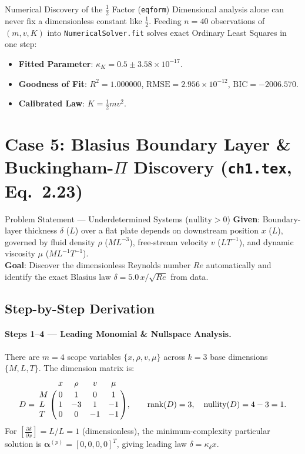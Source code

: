 \documentclass[11pt,a4paper]{article}
\newcommand{\pd}[2]{\frac{\partial #1}{\partial #2}}
\newcommand{\dimbr}[1]{\left[#1\right]}
\begin{document}
\begin{resultbox}{Numerical Discovery of the $\tfrac{1}{2}$ Factor (\texttt{eqform})}
Dimensional analysis alone can never fix a dimensionless constant like $\tfrac{1}{2}$. Feeding $n = 40$ observations of $(m, v, K)$ into \texttt{NumericalSolver.fit} solves exact Ordinary Least Squares in one step:
\begin{itemize}[leftmargin=1.4em,itemsep=2pt]
  \item \textbf{Fitted Parameter}: $\kappa_K = 0.5 \pm 3.58 \times 10^{-17}$.
  \item \textbf{Goodness of Fit}: $R^2 = 1.000000$, $\text{RMSE} = 2.956 \times 10^{-12}$, $\text{BIC} = -2006.570$.
  \item \textbf{Calibrated Law}: $\displaystyle K = \frac{1}{2} m v^2$.
\end{itemize}
\end{resultbox}

\section{Case 5: Blasius Boundary Layer \& Buckingham-$\Pi$ Discovery (\texttt{ch1.tex}, Eq.~2.23)}

\begin{setupbox}{Problem Statement — Underdetermined Systems ($\text{nullity} > 0$)}
\textbf{Given}: Boundary-layer thickness $\delta$ ($L$) over a flat plate depends on downstream position $x$ ($L$), governed by fluid density $\rho$ ($ML^{-3}$), free-stream velocity $v$ ($LT^{-1}$), and dynamic viscosity $\mu$ ($ML^{-1}T^{-1}$).\\
\textbf{Goal}: Discover the dimensionless Reynolds number $Re$ automatically and identify the exact Blasius law $\delta = 5.0\,x/\sqrt{Re}$ from data.
\end{setupbox}

\subsection*{Step-by-Step Derivation}

\paragraph{Steps 1--4 — Leading Monomial \& Nullspace Analysis.}
There are $m = 4$ scope variables $\{x, \rho, v, \mu\}$ across $k = 3$ base dimensions $\{M, L, T\}$. The dimension matrix is:
\[
  D = \bordermatrix{
    & x & \rho & v & \mu \cr
    M & 0 & 1 & 0 & 1 \cr
    L & 1 & -3 & 1 & -1 \cr
    T & 0 & 0 & -1 & -1
  },
  \qquad \text{rank}(D) = 3, \quad \text{nullity}(D) = 4 - 3 = 1.
\]
For $\dimbr{\pd{\delta}{x}} = L/L = 1$ (dimensionless), the minimum-complexity particular solution is $\boldsymbol{\alpha}^{(p)} = [0, 0, 0, 0]^T$, giving leading law $\delta = \kappa_\delta x$.
\end{document}
